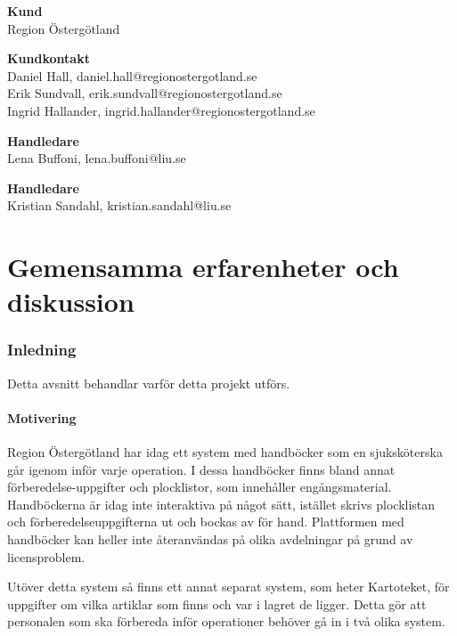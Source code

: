 \documentclass{article}
\begin{document}
\begin{flushleft}
\textbf{Kund} \\ Region Östergötland \\
\end{flushleft}
\begin{flushleft}
\textbf{Kundkontakt} \\ 
Daniel Hall, daniel.hall@regionostergotland.se \\
Erik Sundvall, erik.sundvall@regionostergotland.se \\
Ingrid Hallander, ingrid.hallander@regionostergotland.se \\
\end{flushleft}
\begin{flushleft}
\textbf{Handledare} \\ Lena Buffoni, lena.buffoni@liu.se \\
\end{flushleft}
\begin{flushleft}
\textbf{Handledare} \\ Kristian Sandahl, kristian.sandahl@liu.se \\
\end{flushleft}

\newpage
\tableofcontents
\newpage
{}

\part{Gemensamma erfarenheter och diskussion}

\section{Inledning}
Detta avsnitt behandlar varför detta projekt utförs.

\subsection{Motivering}
Region Östergötland har idag ett system med handböcker som en sjuksköterska går igenom inför varje operation. I dessa handböcker finns bland annat förberedelse-uppgifter och plocklistor, som innehåller engångsmaterial. Handböckerna är idag inte interaktiva på något sätt, istället skrivs plocklistan och förberedelse\-uppgifterna ut och bockas av för hand. Plattformen med handböcker kan heller inte återanvändas på olika avdelningar på grund av licensproblem. 

Utöver detta system så finns ett annat separat system, som heter Kartoteket, för uppgifter om vilka artiklar som finns och var i lagret de ligger. Detta gör att personalen som ska förbereda inför operationer behöver gå in i två olika system. 
\end{document}
